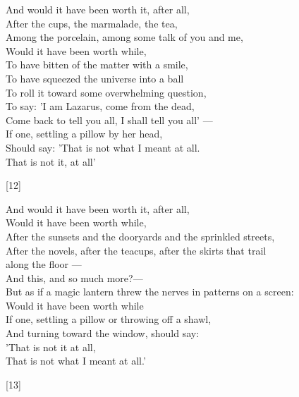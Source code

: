 \documentclass{article}
\begin{document}
\begin{minipage}{9cm}
    And would it have been worth it, after all,\\
    After the cups, the marmalade, the tea,\\
    Among the porcelain, among some talk of you and me,\\
    Would it have been worth while,\\
    To have bitten of the matter with a smile,\\
    To have squeezed the universe into a ball\\
    To roll it toward some overwhelming question,\\
    To say: 'I am Lazarus, come from the dead, \\
    Come back to tell you all, I shall tell you all' ---\\
    If one, settling a pillow by her head,\\
    \quad{} Should say: 'That is not what I meant at all.\\
    \quad{} That is not it, at all'
    \begin{center}[12]\end{center}
\end{minipage}

\begin{minipage}{10cm}
    And would it have been worth it, after all,\\
    Would it have been worth while,\\
    After the sunsets and the dooryards and the sprinkled streets,\\
    After the novels, after the teacups, after the skirts that trail\\
    \quad{}along the floor ---\\
    And this, and so much more?---\\
    But as if a magic lantern threw the nerves in patterns on a screen:\\
    Would it have been worth while\\
    If one, settling a pillow or throwing off a shawl,\\
    And turning toward the window, should say:\\
    \quad{}'That is not it at all,\\
    \quad{}That is not what I meant at all.'
    \begin{center}[13]\end{center}
\end{minipage}
\end{document}
